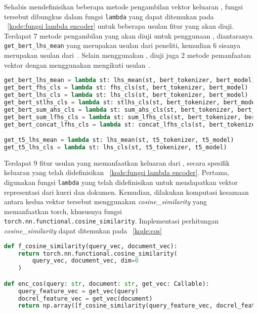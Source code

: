 Sehabis mendefinisikan beberapa metode pengambilan vektor keluaran \hs{}, fungsi tersebut dibungkus dalam fungsi \lstinline{lambda} yang dapat ditemukan pada \kode{}~\ref{kode:fungsi lambda encoder} untuk beberapa usulan fitur yang akan diuji. Terdapat 7 metode pengambilan yang akan diuji untuk penggunaan \bert{}, diantaranya \lstinline{get_bert_lhs_mean} yang merupakan usulan dari peneliti, kemudian 6 sisanya merupakan usulan dari~\citeauthor{devlin2018bert}. Selain menggunakan \bert{}, diuji juga 2 metode pemanfaatan vektor dengan menggunakan \encoder{} \tfive{} mengikuti usulan~\citeauthor{ni2021sentence}.
\begin{lstlisting}[language=Python, caption={Fungsi lambda pengambilan vektor}, label={kode:fungsi lambda encoder}]
get_bert_lhs_mean = lambda st: lhs_mean(st, bert_tokenizer, bert_model)
get_bert_fhs_cls = lambda st: fhs_cls(st, bert_tokenizer, bert_model)
get_bert_lhs_cls = lambda st: lhs_cls(st, bert_tokenizer, bert_model)
get_bert_stlhs_cls = lambda st: stlhs_cls(st, bert_tokenizer, bert_model)
get_bert_sum_ahs_cls = lambda st: sum_ahs_cls(st, bert_tokenizer, bert_model)
get_bert_sum_lfhs_cls = lambda st: sum_lfhs_cls(st, bert_tokenizer, bert_model)
get_bert_concat_lfhs_cls = lambda st: concat_lfhs_cls(st, bert_tokenizer, bert_model)

get_t5_lhs_mean = lambda st: lhs_mean(st, t5_tokenizer, t5_model)
get_t5_lhs_cls = lambda st: lhs_cls(st, t5_tokenizer, t5_model)
\end{lstlisting}


Terdapat 9 fitur usulan yang memanfaatkan keluaran dari \encoder{}, secara spesifik keluaran yang telah didefinisikan \kode{}~\ref{kode:fungsi lambda encoder}. Pertama, digunakan fungsi \lstinline{lambda} yang telah didefinisikan untuk mendapatkan vektor representasi dari kueri dan dokumen. Kemudian, dilakukan komputasi kesamaan antara kedua vektor tersebut menggunakan \textit{cosine\_similarity} yang memanfaatkan \library{} torch, khususnya fungsi \lstinline{torch.nn.functional.cosine_similarity}. Implementasi perhitungan \textit{cosine\_similarity} dapat ditemukan pada \kode{}~\ref{kode:cos}
\begin{lstlisting}[language=Python, caption={Fungsi ekstraksi fitur \textit{cosine\_similarity}}, label={kode:cos}]
def f_cosine_similarity(query_vec, document_vec):
    return torch.nn.functional.cosine_similarity(
        query_vec, document_vec, dim=0
    )

def enc_cos(query: str, document: str, get_vec: Callable):
    query_feature_vec = get_vec(query)
    docrel_feature_vec = get_vec(document)
    return np.array([f_cosine_similarity(query_feature_vec, docrel_feature_vec)])
\end{lstlisting}

